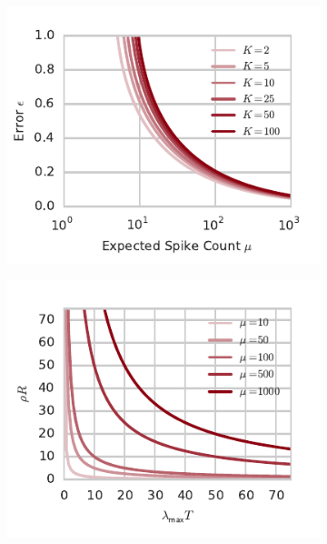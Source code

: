 \begin{figure}[t!]
  \centering
  \begin{subfigure}[b]{2.75in}
   \centering
   \caption{}
   \vspace{-.4in}
   \includegraphics[width=\textwidth]{figures/ch9/error_vs_expected_spike_count}
   \label{fig:error_vs_expected_spike_count}
 \end{subfigure}
 \begin{subfigure}[b]{2.75in}
   \centering
   \caption{}
   \vspace{-.4in}
   \includegraphics[width=\textwidth]{figures/ch9/mu_for_R_T}

\end{subfigure}
\end{figure}
